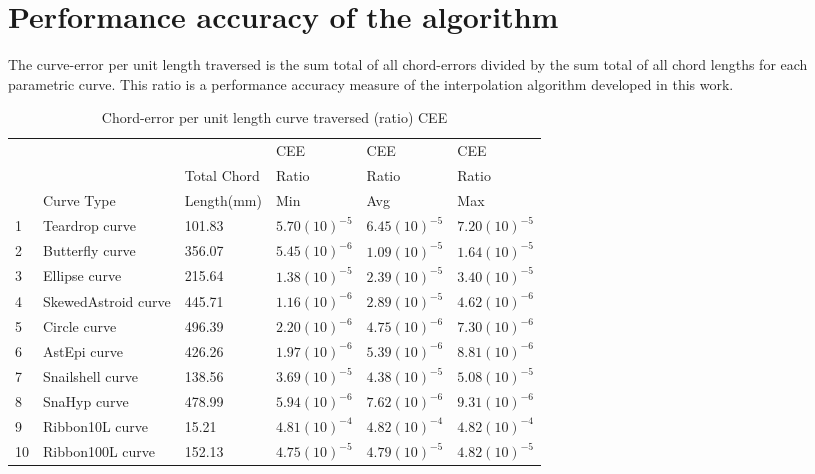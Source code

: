 	
\section{Performance accuracy of the algorithm}	
	
\noindent
The curve-error per unit length traversed is the sum total of all chord-errors divided by the sum total of all chord lengths for each parametric curve. This ratio is a performance accuracy measure of the interpolation algorithm developed in this work.
	
\begin{table}[ht]
\caption{Chord-error per unit length curve traversed (ratio) CEE}
\label{Chord-error-per-unit-curve-traversed-FC20}
\begin{tabular}{p{0.5cm} p{4.0cm} p{2.5cm} p{2.0cm} p{2.0cm} p{2.0cm} }
\hline	
			  &              &                & CEE    & CEE   & CEE \\
			  &              &    Total Chord & Ratio & Ratio & Ratio \\
			  & Curve Type   &    Length(mm)  & Min   &  Avg  & Max\\
			\hline
			1 &	Teardrop curve      & 101.83  & $5.70(10)^{-5}$ & $6.45(10)^{-5}$ & $7.20(10)^{-5}$ \\ 
			2 &	Butterfly curve     & 356.07  & $5.45(10)^{-6}$ & $1.09(10)^{-5}$ & $1.64(10)^{-5}$ \\ 
			3 &	Ellipse curve       & 215.64  & $1.38(10)^{-5}$ & $2.39(10)^{-5}$ & $3.40(10)^{-5}$ \\ 
			4 &	SkewedAstroid curve & 445.71  & $1.16(10)^{-6}$ & $2.89(10)^{-5}$ & $4.62(10)^{-6}$ \\ 
			5 &	Circle curve        & 496.39  & $2.20(10)^{-6}$ & $4.75(10)^{-6}$ & $7.30(10)^{-6}$ \\
			6 &	AstEpi curve        & 426.26  & $1.97(10)^{-6}$ & $5.39(10)^{-6}$ & $8.81(10)^{-6}$ \\  
			7 &	Snailshell curve    & 138.56  & $3.69(10)^{-5}$ & $4.38(10)^{-5}$ & $5.08(10)^{-5}$ \\
			8 &	SnaHyp curve        & 478.99  & $5.94(10)^{-6}$ & $7.62(10)^{-6}$ & $9.31(10)^{-6}$ \\
			9 &	Ribbon10L curve     & 15.21   & $4.81(10)^{-4}$ & $4.82(10)^{-4}$ & $4.82(10)^{-4}$ \\ 
			10 & Ribbon100L curve   & 152.13  & $4.75(10)^{-5}$ & $4.79(10)^{-5}$ & $4.82(10)^{-5}$ \\ 	
\hline
\end{tabular}
\end{table}

